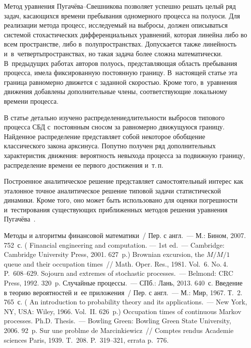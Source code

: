\begin{multicols}{2}
Метод уравнения Пу\-га\-чё\-ва--Свеш\-ни\-ко\-ва позволяет успешно решать целый ряд задач, ка\-са\-ющих\-ся времени пребывания одномерного процесса на полуоси. Для реализации метода процесс, исследуемый на выбросы, должен описываться сис\-те\-мой стохастических дифференциальных уравнений, которая линейна либо во всем пространстве, либо в~полупространствах. Допускается также линейность и~в~четвертьпространствах, но такая задача более сложна математически. В~предыдущих работах авторов полуось, представляющая область пребывания процесса, имела фиксированную постоянную границу. В~настоящей статье эта граница равномерно движется с заданной скоростью. Кроме того, в~уравнения движения добавлены дополнительные члены, соответствующие локальному времени процесса.

В статье детально изучено распределение\linebreak длительности выбросов типового процесса СБД с~постоянным сносом за равномерно движущуюся границу. Найденное распределение представляет \mbox{собой} некоторое обобщение классического закона арксинуса. Попутно получен ряд дополнительных характеристик движения: вероятность невыхода процесса за подвижную границу, распределение времени ее первого достижения и~т.\,п.

Построенное аналитическое решение пред\-став\-ля\-ет самостоятельный интерес как эталонное точное аналитическое решение типовой задачи статистической динамики. Кроме того, оно может быть использовано для оценки погрешности и~тес\-ти\-ро\-ва\-ния существующих приближенных методов решения уравнения Пугачёва~\cite{ref22}.

{\small\frenchspacing
 {%
 \begin{thebibliography}{99}
 Методы и алгоритмы финансовой математики~/ Пер. с англ.~--- М.: Бином, 2007. 752~с. ( Financial engineering and computation. --- 1st ed.~--- Cambridge: Cambridge University Press, 2001. 627~p.)
 Brownian excursion, the $M/M/1$ queue and their occupation times~// Math. Oper. Res., 1981. Vol.~6. No.\,4. P.~608--629.
 Sojourn and extremes of stochastic processes.~--- Belmond: CRC Press, 1992. 320~p.
 Случайные процессы.~--- СПб.: Лань, 2013. 640~с.
 Введение в теорию вероятностей и~ее приложения~/ Пер. с англ.~--- М.: Мир, 1967.  Т.~2. 765~с. ( An introduction to probability theory and its applications.~--- New York, NY, USA: Wiley, 1966.  Vol.~II. 626~p.)
 Occupation times of continuous Markov processes. Ph.D. Thesis.~--- Bowling Green: Bowling Green State University, 2006. 92~p.
 Sur une
probl{\fontsize{10pt}{10pt}\selectfont{}}me de Marcinkiewicz~// Comptes rendus Academie sciences Paris, 1939. T.~208. P.~319--321, errata p.~776.


\end{thebibliography}}}
\end{multicols}
